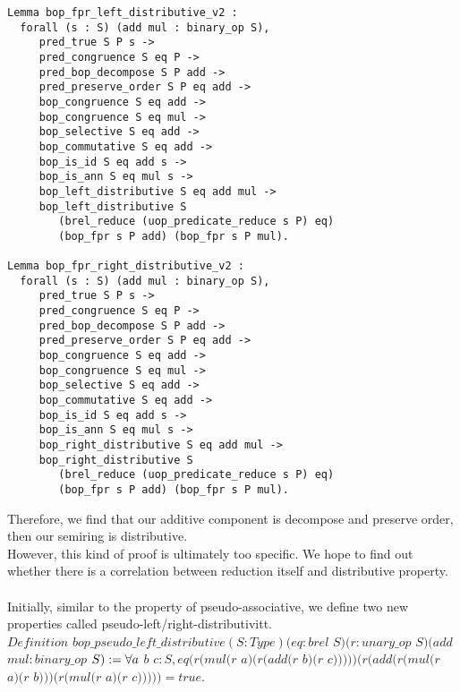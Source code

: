 \documentclass[a4paper,12pt,twoside,openright]{report}
\begin{document}
\begin{lstlisting}
Lemma bop_fpr_left_distributive_v2 :
  forall (s : S) (add mul : binary_op S),
     pred_true S P s -> 
     pred_congruence S eq P ->
     pred_bop_decompose S P add ->
     pred_preserve_order S P eq add ->
     bop_congruence S eq add ->     
     bop_congruence S eq mul -> 
     bop_selective S eq add ->
     bop_commutative S eq add ->
     bop_is_id S eq add s ->     
     bop_is_ann S eq mul s ->
     bop_left_distributive S eq add mul ->
     bop_left_distributive S 
     	(brel_reduce (uop_predicate_reduce s P) eq) 
     	(bop_fpr s P add) (bop_fpr s P mul).
     	
Lemma bop_fpr_right_distributive_v2 :
  forall (s : S) (add mul : binary_op S),
     pred_true S P s -> 
     pred_congruence S eq P ->
     pred_bop_decompose S P add ->
     pred_preserve_order S P eq add ->
     bop_congruence S eq add ->     
     bop_congruence S eq mul -> 
     bop_selective S eq add ->
     bop_commutative S eq add ->
     bop_is_id S eq add s ->     
     bop_is_ann S eq mul s ->
     bop_right_distributive S eq add mul ->
     bop_right_distributive S 
     	(brel_reduce (uop_predicate_reduce s P) eq) 
     	(bop_fpr s P add) (bop_fpr s P mul).
\end{lstlisting}
Therefore, we find that our additive component is decompose and preserve order, then our semiring is distributive.\\
However, this kind of proof is ultimately too specific. We hope to find out whether there is a correlation between reduction itself and distributive property.\\\\
Initially, similar to the property of pseudo-associative, we define two new properties called pseudo-left/right-distributivitt.\\
$Definition$ $bop\_pseudo\_left\_distributive (S : Type) (eq : brel$ $S) (r : unary\_op$ $S) (add$ $mul : binary\_op$ $S) \\
  := \forall a$ $b$ $c : S, 
  eq (r (mul (r$ $a) (r (add (r$ $b) (r$ $c))))) (r (add (r (mul (r$ $a) (r$ $b))) (r (mul (r$ $a) (r$ $c))))) = true. $
         
\end{document}
